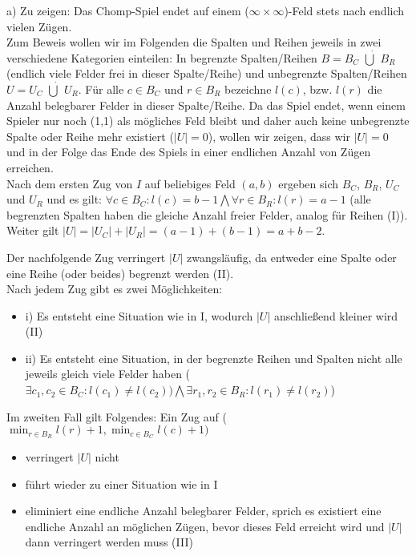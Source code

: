 \documentclass{scrartcl}
\begin{document}
a) Zu zeigen: Das Chomp-Spiel endet auf einem ($\infty \times \infty$)-Feld stets nach endlich
vielen Zügen. \\

Zum Beweis wollen wir im Folgenden die Spalten und Reihen jeweils in zwei verschiedene Kategorien
einteilen: In begrenzte Spalten/Reihen $B = B_C$ $\dot{\bigcup}$ $B_R$ (endlich viele Felder frei in
dieser Spalte/Reihe) und unbegrenzte Spalten/Reihen $U = U_C$ $\dot{\bigcup}$ $U_R$. Für alle
$c \in B_C$ und $r \in B_R$ bezeichne $l(c)$, bzw. $l(r)$ die Anzahl belegbarer Felder in dieser
Spalte/Reihe. Da das Spiel endet, wenn einem Spieler nur noch (1,1) als mögliches Feld bleibt und
daher auch keine unbegrenzte Spalte oder Reihe mehr existiert ($|U| = 0$), wollen wir zeigen, dass
wir $|U| = 0$ und in der Folge das Ende des Spiels in einer endlichen Anzahl von Zügen erreichen.\\

Nach dem ersten Zug von $I$ auf beliebiges Feld $(a,b)$ ergeben sich $B_C$, $B_R$, $U_C$ und $U_R$ 
und es gilt: $\forall c \in B_C : l(c) = b-1 \bigwedge \forall r \in B_R : l(r) = a - 1$ (alle
begrenzten Spalten haben die gleiche Anzahl freier Felder, analog für Reihen (I)). Weiter gilt
$|U| = |U_C| + |U_R| = (a-1) + (b-1) = a + b - 2$.

Der nachfolgende Zug verringert $|U|$ zwangsläufig, da entweder eine Spalte oder eine Reihe (oder
beides) begrenzt werden (II). \\

Nach jedem Zug gibt es zwei Möglichkeiten:
\begin{itemize}
\item{i) Es entsteht eine Situation wie in I, wodurch $|U|$ anschließend kleiner wird (II)}
\item{ii) Es entsteht eine Situation, in der begrenzte Reihen und Spalten nicht alle jeweils
gleich viele Felder haben ($\exists c_1, c_2 \in B_C : l(c_1) \neq l(c_2)) \bigwedge \exists 
r_1, r_2 \in B_R : l(r_1) \neq l(r_2)$)}
\end{itemize}

Im zweiten Fall gilt Folgendes: Ein Zug auf ($\min_{r \in B_R}{l(r)}+1,\min_{c \in B_C}{l(c)}+1)$
\begin{itemize}
\item{verringert $|U|$ nicht}
\item{führt wieder zu einer Situation wie in I}
\item{eliminiert eine endliche Anzahl belegbarer Felder, sprich es existiert  eine endliche Anzahl 
an möglichen Zügen, bevor dieses Feld erreicht wird und $|U|$ dann verringert werden muss (III)}
\end{itemize}
\end{document}
